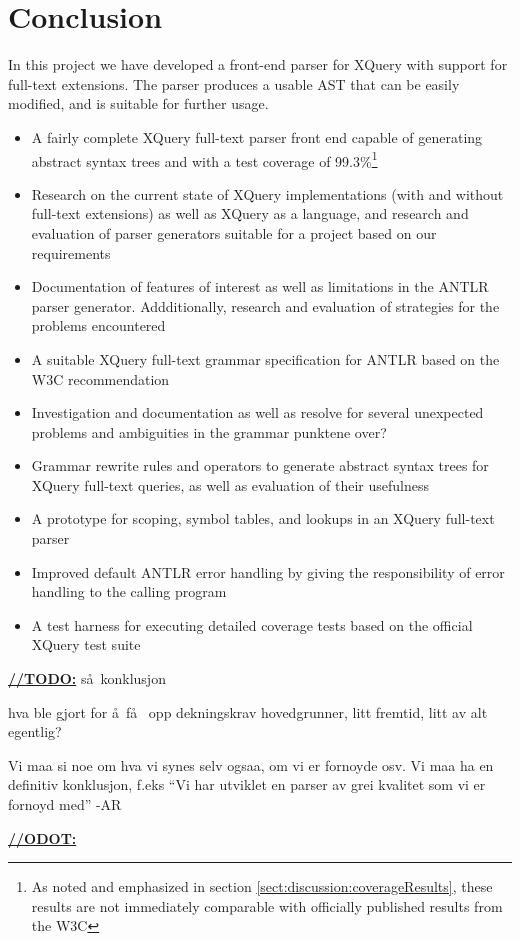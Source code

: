 \chapter{Conclusion}
\label{chapter:conclusion}

In this project we have developed a front-end parser for XQuery with support
for full-text extensions. The parser produces a usable AST that can be easily
modified, and is suitable for further usage.  

\begin{itemize}
  \item A fairly complete XQuery full-text parser front end capable of
  generating abstract syntax trees and with a test coverage of
  99.3\%\footnote{As noted and emphasized in section
  \ref{sect:discussion:coverageResults},
  these results are not immediately comparable with officially published results
  from the W3C}
  \item Research on the current state of XQuery implementations (with and
  without full-text extensions) as well as XQuery as a language, and research and
  evaluation of parser generators suitable for a project based on our requirements
  \item Documentation of features of interest as well as limitations in the
  ANTLR parser generator. Addditionally, research and evaluation of
  strategies for the problems encountered
  \item A suitable XQuery full-text grammar specification for ANTLR based on the
  W3C recommendation
  \item Investigation and documentation as well as resolve for several unexpected
  problems and ambiguities in the grammar
  punktene over?
  \item Grammar rewrite rules and operators to generate abstract
  syntax trees for XQuery full-text queries, as well as evaluation of their
  usefulness
  \item A prototype for scoping, symbol tables, and lookups in an XQuery
  full-text parser
  \item Improved default ANTLR error handling by giving the responsibility
  of error handling to the calling program
  \item A test harness for executing detailed coverage tests based on the
  official XQuery test suite
\end{itemize}


\underline{\textbf{\LARGE //TODO:}}
s\aa~konklusjon


hva ble gjort for \aa ~f\aa~ opp dekningskrav hovedgrunner, litt fremtid, litt
av alt egentlig? 

Vi maa si noe om hva vi synes selv ogsaa, om vi er fornoyde osv. Vi maa ha en
definitiv konklusjon, f.eks ``Vi har utviklet en parser av grei kvalitet som vi
er fornoyd med'' 
-AR

\underline{\textbf{\LARGE //ODOT:}}